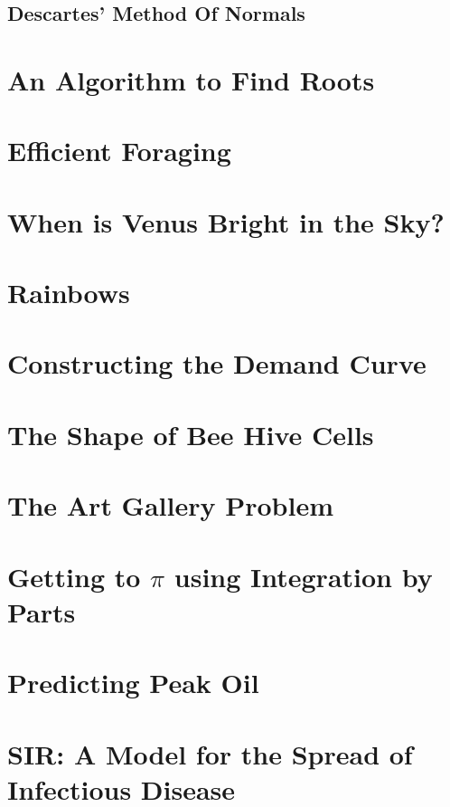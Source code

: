 \documentclass{amsbook}
\begin{document}
    	\subsection*{Descartes' Method Of Normals}
    		
    \newpage		
    \section{An Algorithm to Find Roots}
    
    \section{Efficient Foraging}
    
    \section{When is Venus Bright in the Sky?}
    
    \section{Rainbows}
    
    \section{Constructing the Demand Curve}
    
    \section{The Shape of Bee Hive Cells}
    
    \section{The Art Gallery Problem}
    
    \section{Getting to $\pi$ using Integration by Parts}
    
    \section{Predicting Peak Oil}
    
    \section{SIR: A Model for the Spread of Infectious Disease}
    
\end{document}
